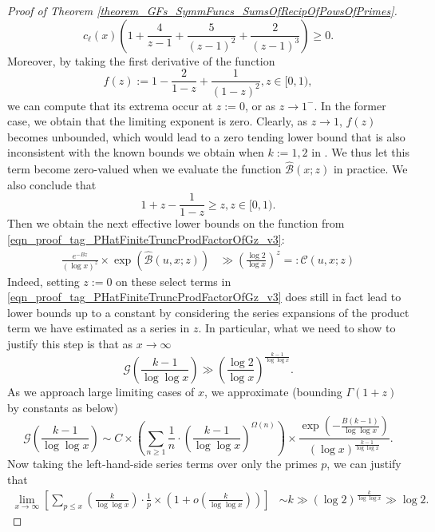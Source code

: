 \documentclass[11pt,reqno,a4letter]{article}
\numberwithin{figure}{section}
\numberwithin{table}{section}
\theoremstyle{plain}
\numberwithin{theorem}{section}
\theoremstyle{definition}
\begin{document}
\begin{proof}[Proof of Theorem \ref{theorem_GFs_SymmFuncs_SumsOfRecipOfPowsOfPrimes}]
\[
c_{\ell}(x) \left( 
     1 + \frac{4}{z-1} + \frac{5}{(z-1)^2} + \frac{2}{(z-1)^3}\right) \geq 0. 
\]
Moreover, by taking the first derivative of the function 
\[
f(z) := 1 - \frac{2}{1-z} + \frac{1}{(1-z)^2}, z \in [0, 1), 
\]
we can compute that its extrema occur at $z := 0$, or as $z \rightarrow 1^{-}$. 
In the former case, we obtain that the limiting exponent is zero. 
Clearly, as $z \rightarrow 1$, $f(z)$ becomes unbounded, which would lead to 
a zero tending lower bound that is also inconsistent with the known bounds we 
obtain when $k := 1, 2$ in \cite[\S 7.4,\ p. 228]{MV}. 
We thus let this term become 
zero-valued when we evaluate the function $\widehat{\mathcal{B}}(x; z)$ in practice. 
We also conclude that 
\[
1 + z - \frac{1}{1-z} \geq z, z \in [0, 1). 
\]
Then we obtain the next effective lower bounds on the function from 
\eqref{eqn_proof_tag_PHatFiniteTruncProdFactorOfGz_v3}:  
\begin{align} 
\label{eqn_proof_tag_simpl_v1} 
\frac{e^{-Bz}}{(\log x)^{z}} \times \exp\left(\widehat{\mathcal{B}}(u, x; z)\right) & \gg 
     \left(\frac{\log 2}{\log x}\right)^{z} =: \widehat{\mathcal{C}}(u, x; z) 
\end{align} 
Indeed, setting $z := 0$ on these select terms in 
\eqref{eqn_proof_tag_PHatFiniteTruncProdFactorOfGz_v3} does still in fact lead to lower bounds 
up to a constant by considering the series expansions of the product term we have estimated as a 
series in $z$. 
In particular, what we need to show to justify this step is that as $x \rightarrow \infty$ 
     \[
     \mathcal{G}\left(\frac{k-1}{\log\log x}\right) \gg 
          \left(\frac{\log 2}{\log x}\right)^{\frac{k-1}{\log\log x}}. 
     \] 
     As we approach large limiting cases of $x$, we approximate 
     (bounding $\Gamma(1+z)$ by constants as below) 
     \[
     \mathcal{G}\left(\frac{k-1}{\log\log x}\right) \sim 
          C \times 
          \left(\sum_{n \geq 1} \frac{1}{n} \cdot \left(\frac{k-1}{\log\log x}\right)^{\Omega(n)}\right) \times 
          \frac{\exp\left(-\frac{B(k-1)}{\log\log x}\right)}{(\log x)^{\frac{k-1}{\log\log x}}}. 
     \]
     Now taking the left-hand-side series terms over only the primes $p$, we can justify that 
     \begin{align*} 
     \lim_{x \rightarrow \infty} \left[ \sum_{p \leq x} \left(\frac{k}{\log\log x}\right) \cdot 
          \frac{1}{p} \times \left(1 + o\left(\frac{k}{\log\log x}\right)\right) 
          \right] & \sim k 
          \gg (\log 2)^{\frac{k}{\log\log x}} \gg \log 2. 

\end{align*}
\end{proof}
\end{document}
